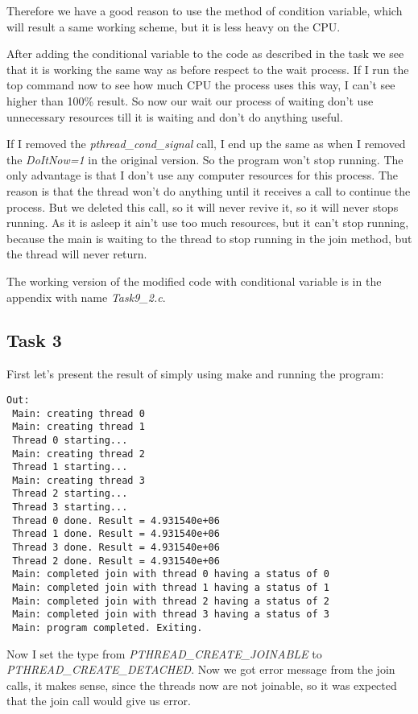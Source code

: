 Therefore we have a good reason to use the method of condition variable, which will result a same working scheme, but it is less heavy on the CPU.

After adding the conditional variable to the code as described in the task we see that it is working the same way as before respect to the wait process. If I run the top command now to see how much CPU the process uses this way, I can't see higher than 100\% result. So now our wait our process of waiting don't use unnecessary resources till it is waiting and don't do anything useful.

If I removed the \textit{pthread\_cond\_signal} call, I end up the same as when I removed the \textit{DoItNow=1} in the original version. So the program won't stop running. The only advantage is that I don't use any computer resources for this process. The reason is that the thread won't do anything until it receives a call to continue the process. But we deleted this call, so it will never revive it, so it will never stops running. As it is asleep it ain't use too much resources, but it can't stop running, because the main is waiting to the thread to stop running in the join method, but the thread will never return.

The working version of the modified code with conditional variable is in the appendix with name \textit{Task9\_2.c}.

\subsection*{Task 3}
First let's present the result of simply using make and running the program:

\begin{lstlisting}[basicstyle=\ttfamily,frame=single]
Out:
 Main: creating thread 0
 Main: creating thread 1
 Thread 0 starting...
 Main: creating thread 2
 Thread 1 starting...
 Main: creating thread 3
 Thread 2 starting...
 Thread 3 starting...
 Thread 0 done. Result = 4.931540e+06
 Thread 1 done. Result = 4.931540e+06
 Thread 3 done. Result = 4.931540e+06
 Thread 2 done. Result = 4.931540e+06
 Main: completed join with thread 0 having a status of 0
 Main: completed join with thread 1 having a status of 1
 Main: completed join with thread 2 having a status of 2
 Main: completed join with thread 3 having a status of 3
 Main: program completed. Exiting.
\end{lstlisting}

Now I set the type from \textit{PTHREAD\_CREATE\_JOINABLE} to\\ \textit{PTHREAD\_CREATE\_DETACHED}. Now we got error message from the join calls, it makes sense, since the threads now are not joinable, so it was expected that the join call would give us error.

